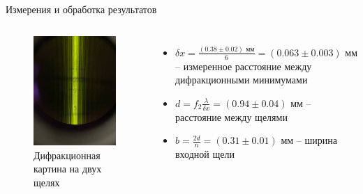 \documentclass[11pt]{beamer} %
\begin{document}
    \begin{frame}{Измерения и обработка результатов}
     \begin{columns}
     
            \begin{figure}[H]
            \centering
                \includegraphics[width = \textwidth]{images/photo_3.jpg}
                \caption{Дифракционная картина на двух щелях}
            \end{figure}

            \begin{itemize}
                \item $\delta x = \frac{ \left( 0.38 \pm 0.02 \right) \text{ мм}}{6} = \left( 0.063 \pm 0.003 \right) \text{ мм}$ -- измеренное расстояние между дифракционными минимумами
                \item $d = f_2 \frac{\lambda}{\delta x} = \left( 0.94 \pm 0.04 \right) \text{ мм}$ -- расстояние между щелями
                \item $b = \frac{2d}{n} = \left( 0.31 \pm 0.01 \right) \text{ мм}$ -- ширина входной щели
        \end{itemize}
        
        \end{columns}
    \end{frame}
\end{document}
